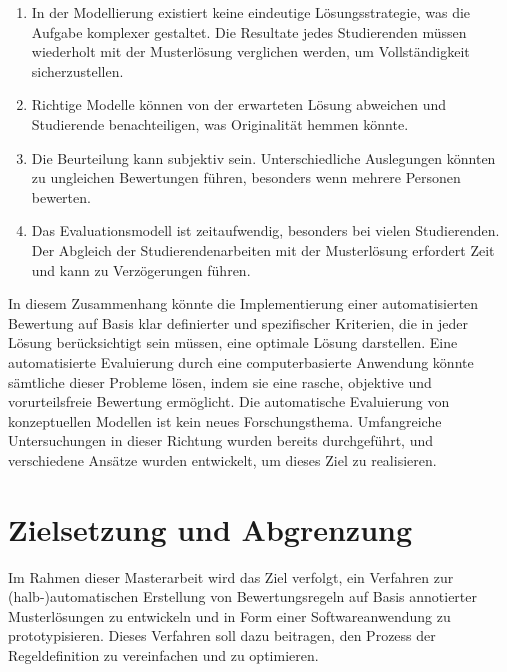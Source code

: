 \begin{enumerate}
    \item In der Modellierung existiert keine eindeutige Lösungsstrategie, was die Aufgabe komplexer gestaltet. Die
    Resultate jedes Studierenden müssen wiederholt mit der Musterlösung verglichen werden, um Vollständigkeit sicherzustellen.

    \item Richtige Modelle können von der erwarteten Lösung abweichen und Studierende benachteiligen, was Originalität
    hemmen könnte.

    \item Die Beurteilung kann subjektiv sein. Unterschiedliche Auslegungen könnten zu ungleichen Bewertungen führen,
    besonders wenn mehrere Personen bewerten.

    \item Das Evaluationsmodell ist zeitaufwendig, besonders bei vielen Studierenden. Der Abgleich der Studierendenarbeiten
    mit der Musterlösung erfordert Zeit und kann zu Verzögerungen führen.

\end{enumerate}
    

In diesem Zusammenhang könnte die Implementierung einer automatisierten Bewertung auf Basis klar definierter und spezifischer Kriterien, die in jeder Lösung berücksichtigt sein müssen, eine optimale Lösung darstellen. Eine automatisierte Evaluierung durch eine computerbasierte Anwendung könnte sämtliche dieser Probleme lösen, indem sie eine rasche, objektive und vorurteilsfreie Bewertung ermöglicht. Die automatische Evaluierung von \gls{konzeptuellen Modellen} ist kein neues Forschungsthema. Umfangreiche Untersuchungen in dieser Richtung wurden bereits durchgeführt, und verschiedene Ansätze wurden entwickelt, um dieses Ziel zu realisieren.

\section{Zielsetzung und Abgrenzung}

Im Rahmen dieser Masterarbeit wird das Ziel verfolgt, ein Verfahren zur (halb-)automatischen Erstellung von Bewertungsregeln auf Basis annotierter Musterlösungen zu entwickeln und in Form einer Softwareanwendung zu prototypisieren. Dieses Verfahren soll dazu beitragen, den Prozess der Regeldefinition zu vereinfachen und zu optimieren.

